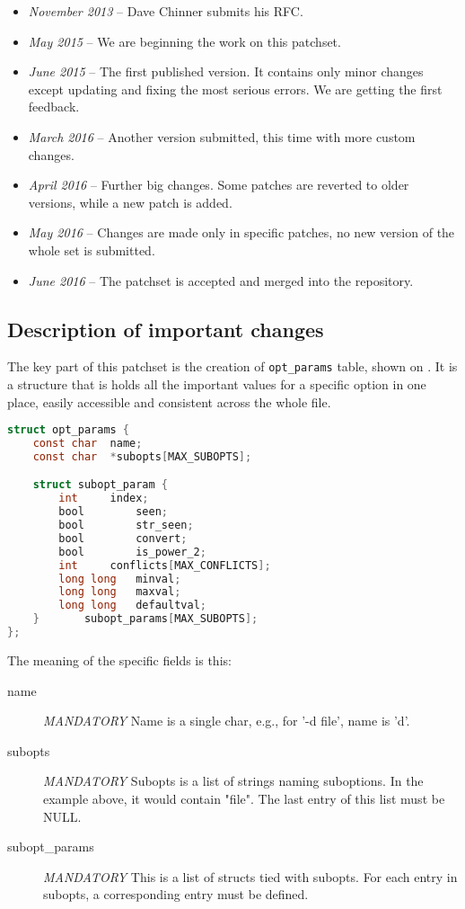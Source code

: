 \begin{itemize}
	\item {\em November 2013} -- Dave Chinner submits his RFC.
	\item {\em May 2015} -- We are beginning the work on this patchset.
	\item {\em June 2015} -- The first published version. It contains
		only minor changes except updating and fixing the most
		serious errors. We are getting the first feedback.
	\item {\em March 2016} -- Another version submitted, this time with
		more custom changes.
	\item {\em April 2016} -- Further big changes. Some patches are
		reverted to older versions, while a new patch is added.
	\item {\em May 2016} -- Changes are made only in specific patches,
		no new version of the whole set is submitted.
	\item {\em June 2016} -- The patchset is accepted and merged into
		the repository.
\end{itemize}

\subsection{Description of important changes}

The key part of this patchset is the creation of {\tt opt\_params} table,
shown on .
It is a structure that is holds all the important values for a specific
option in one place, easily accessible and consistent across the whole file.

\begin{lstlisting}[frame=none, basicstyle=\footnotesize\ttfamily,
language=C, numbers=none, numberstyle=\tiny\color{black},
caption= {Definition of the table.},
label={lst:refactoring:optparams}]
struct opt_params {
	const char	name;
	const char	*subopts[MAX_SUBOPTS];

	struct subopt_param {
		int		index;
		bool		seen;
		bool		str_seen;
		bool		convert;
		bool		is_power_2;
		int		conflicts[MAX_CONFLICTS];
		long long	minval;
		long long	maxval;
		long long	defaultval;
	}		subopt_params[MAX_SUBOPTS];
};
\end{lstlisting}

The meaning of the specific fields is this:
\begin{description}
\item[name] {\em MANDATORY}
  Name is a single char, e.g., for '-d file', name is 'd'.

\item[subopts] {\em MANDATORY}
  Subopts is a list of strings naming suboptions. In the example above,
  it would contain "file". The last entry of this list must be NULL.

\item[subopt\_params] {\em MANDATORY}
  This is a list of structs tied with subopts. For each entry in subopts,
  a corresponding entry must be defined.
\end{description}


